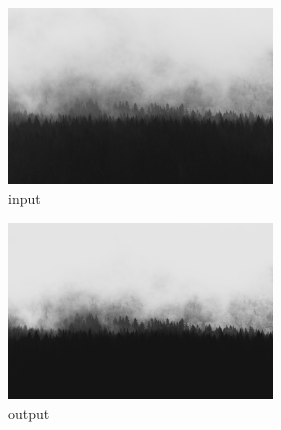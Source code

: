 \documentclass[12pt,a4paper]{article}
\theoremstyle{definition}
\theoremstyle{remark}
\theoremstyle{plain}
\begin{document}
\begin{multicols}{2}
\begin{figure}[H]
\centering
\includegraphics[width=7cm]{images/wood.jpeg}
  \caption{input}\label{tree_fuzzy_grayscale_input}
\end{figure}
\columnbreak
\begin{figure}[H]
\centering
\includegraphics[width=7cm]{images/fuzzy_grayscale_1.jpg}
  \caption{output}\label{fuzzy_grayscale_output1}
\end{figure}
\end{multicols}
\end{document}
